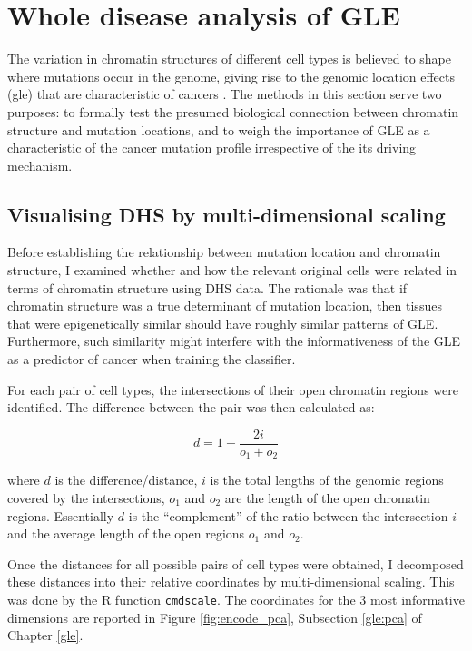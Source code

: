 \section{Whole disease analysis of GLE}\label{methods:gle}

The variation in chromatin structures of different cell types is believed to shape where mutations occur in the genome, giving rise to the genomic location effects (\gls{gle}) that are characteristic of cancers \citep{Polak2015}. The methods in this section serve two purposes: to formally test the presumed biological connection between chromatin structure and mutation locations, and to weigh the importance of GLE as a characteristic of the cancer mutation profile irrespective of the its driving mechanism.  

\subsection{Visualising DHS by multi-dimensional scaling}\label{methods:encode_pca}
Before establishing the relationship between mutation location and chromatin structure, I examined whether and how the relevant original cells were related in terms of chromatin structure using DHS data. The rationale was that if chromatin structure was a true determinant of mutation location, then tissues that were epigenetically similar should have roughly similar patterns of GLE. Furthermore, such similarity might interfere with the informativeness of the GLE as a predictor of cancer when training the classifier.

For each pair of cell types, the intersections of their open chromatin regions were identified. The difference between the pair was then calculated as:

\begin{equation}
    d = 1 - \frac{2i}{o_1 + o_2}
\end{equation}

where $d$ is the difference/distance, $i$ is the total lengths of the genomic regions covered by the intersections, $o_1$ and $o_2$ are the length of the open chromatin regions. Essentially $d$ is the ``complement'' of the ratio between the intersection $i$ and the average length of the open regions $o_1$ and $o_2$. 

Once the distances for all possible pairs of cell types were obtained, I decomposed these distances into their relative coordinates by multi-dimensional scaling. This was done by the R function \texttt{cmdscale}. The coordinates for the 3 most informative dimensions are reported in Figure \ref{fig:encode_pca}, Subsection \ref{gle:pca} of Chapter \ref{gle}.


